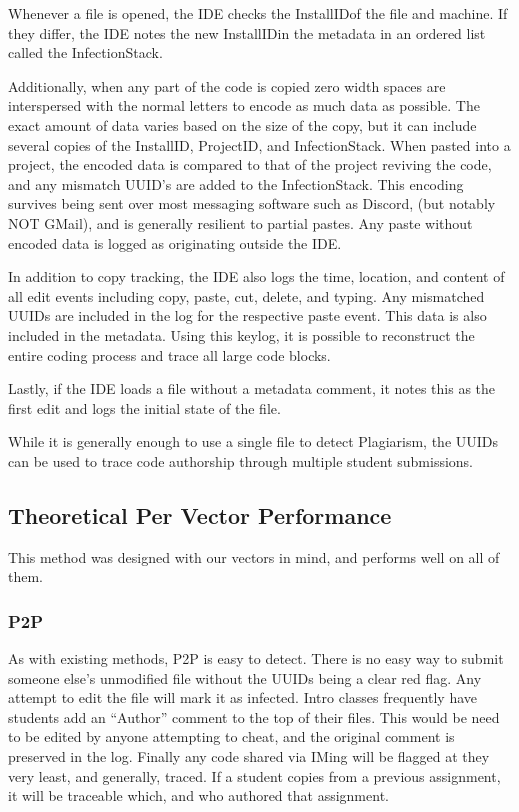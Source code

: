 \documentclass[conference]{IEEEtran}
\newcommand{\installID}{InstallID}
\newcommand{\projectID}{ProjectID}
\newcommand{\infectionStack}{InfectionStack}
\begin{document}
Whenever a file is opened, the IDE checks the \installID of the file and machine.  If they differ, the IDE notes the new \installID in the metadata in an ordered list called the \infectionStack.  

Additionally, when any part of the code is copied zero width spaces are interspersed with the normal letters to encode as much data as possible.  The exact amount of data varies based on the size of the copy, but it can include several copies of the \installID, \projectID, and \infectionStack.  When pasted into a project, the encoded data is compared to that of the project reviving the code, and any mismatch UUID's are added to the \infectionStack. This encoding survives being sent over most messaging software such as Discord, (but notably NOT GMail), and is generally resilient to partial pastes.  Any paste without encoded data is logged as originating outside the IDE.

In addition to copy tracking, the IDE also logs the time, location, and content of all edit events including copy, paste, cut, delete, and typing.  Any mismatched UUIDs are included in the log for the respective paste event.  This data is also included in the metadata.  Using this keylog, it is possible to reconstruct the entire coding process and trace all large code blocks.

Lastly, if the IDE loads a file without a metadata comment, it notes this as the first edit and logs the initial state of the file.

While it is generally enough to use a single file to detect Plagiarism, the UUIDs can be used to trace code authorship through multiple student submissions.

\subsection*{\textbf{Theoretical Per Vector Performance}}
This method was designed with our vectors in mind, and performs well on all of them.
\subsubsection*{\textbf{P2P}}\hfill\break\indent
		As with existing methods, P2P is easy to detect.  There is no easy way to submit someone else's unmodified file without the UUIDs being a clear red flag.  Any attempt to edit the file will mark it as infected.  Intro classes frequently have students add an ``Author'' comment to the top of their files.  This would be need to be edited by anyone attempting to cheat, and the original comment is preserved in the log. Finally any code shared via IMing will be flagged at they very least, and generally, traced.   If a student copies from a previous assignment, it will be traceable which, and who authored that assignment.
		
\end{document}
